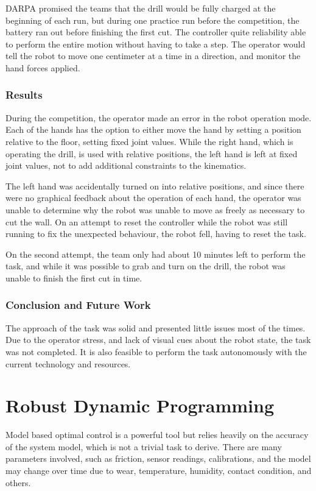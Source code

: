 \documentclass[12pt]{report}
\begin{document}
DARPA promised the teams that the drill would be fully charged at the beginning of each run, but during one practice run before the competition, the battery ran out before finishing the first cut. The controller quite reliability able to perform the entire motion without having to take a step. The operator would tell the robot to move one centimeter at a time in a direction, and monitor the hand forces applied.  

\subsection{Results}
During the competition, the operator made an error in the robot operation mode. Each of the hands has the option to either move the hand by setting a position relative to the floor, setting fixed joint values. While the right hand, which is operating the drill, is used with relative positions, the left hand is left at fixed joint values, not to add additional constraints to the kinematics. 

The left hand was accidentally turned on into relative positions, and since there were no graphical feedback about the operation of each hand, the operator was unable to determine why the robot was unable to move as freely as necessary to cut the wall. On an attempt to reset the controller while the robot was still running to fix the unexpected behaviour, the robot fell, having to reset the task. 

On the second attempt, the team only had about 10 minutes left to perform the task, and while it was possible to grab and turn on the drill, the robot was unable to finish the first cut in time.

\subsection{Conclusion and Future Work}

The approach of the task was solid and presented little issues most of the times. Due to the operator stress, and lack of visual cues about the robot state, the task was not completed. It is also feasible to perform the task autonomously with the current technology and resources. 

\chapter{Robust Dynamic Programming}
Model based optimal control is a powerful tool but relies heavily on the accuracy of the system model, which is not a trivial task to derive. There are many parameters involved, such as friction, sensor readings, calibrations, and the model may change over time due to wear, temperature, humidity, contact condition, and others.
\end{document}
